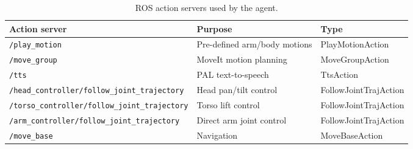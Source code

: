 \begin{table}[H]
\centering
\caption{ROS action servers used by the agent.}
\label{tab:action_servers}
\footnotesize
\begin{tabularx}{\linewidth}{lXl}
\toprule
\textbf{Action server} & \textbf{Purpose} & \textbf{Type} \\
\midrule
\texttt{/play\_motion}                               & Pre-defined arm/body motions & PlayMotionAction \\
\texttt{/move\_group}                                & MoveIt motion planning       & MoveGroupAction \\
\texttt{/tts}                                        & PAL text-to-speech           & TtsAction \\
\texttt{/head\_controller/follow\_joint\_trajectory} & Head pan/tilt control        & FollowJointTrajAction \\
\texttt{/torso\_controller/follow\_joint\_trajectory}& Torso lift control           & FollowJointTrajAction \\
\texttt{/arm\_controller/follow\_joint\_trajectory}  & Direct arm joint control     & FollowJointTrajAction \\
\texttt{/move\_base}                                 & Navigation                   & MoveBaseAction \\
\bottomrule
\end{tabularx}
\normalsize
\end{table}
